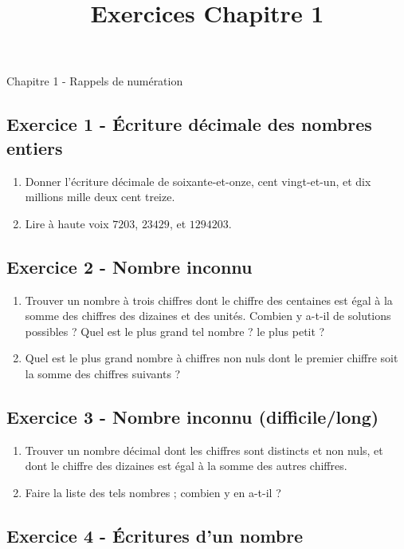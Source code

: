 \documentclass[12 pt]{extarticle}
\title{Exercices Chapitre 1}
\date{}
\theoremstyle{plain}
\begin{document}
\begin{center}{\Large Chapitre 1 - Rappels de  numération}\\ 
 \end{center}
 
 
 \subsection*{Exercice 1 - Écriture décimale des nombres entiers}
 
 \begin{enumerate}
 \item Donner l'écriture décimale de soixante-et-onze, cent vingt-et-un, et dix millions mille deux cent treize. 
 \item Lire à haute voix $7203$, $23429$, et $1294203$. 
\end{enumerate} 
 
 
  
\subsection*{Exercice 2 - Nombre inconnu }
\begin{enumerate}
\item Trouver un nombre à trois chiffres dont le chiffre des centaines est égal à la somme des chiffres des dizaines et des unités. Combien y a-t-il de solutions possibles ? Quel est le plus grand tel nombre ? le plus petit ? 
\item Quel est le plus grand nombre à chiffres non nuls dont le premier chiffre soit la somme des chiffres suivants ?
 
 \end{enumerate}
 
 
 
 
\subsection*{Exercice 3 - Nombre inconnu (difficile/long)}
 \begin{enumerate}
\item Trouver un nombre décimal dont les chiffres sont distincts et non nuls, et dont le chiffre des dizaines est égal à la somme des autres chiffres. 
\item Faire la liste des tels nombres ; combien y en a-t-il ? 
\end{enumerate}

\subsection*{Exercice 4 - Écritures d'un nombre}
\end{document}
